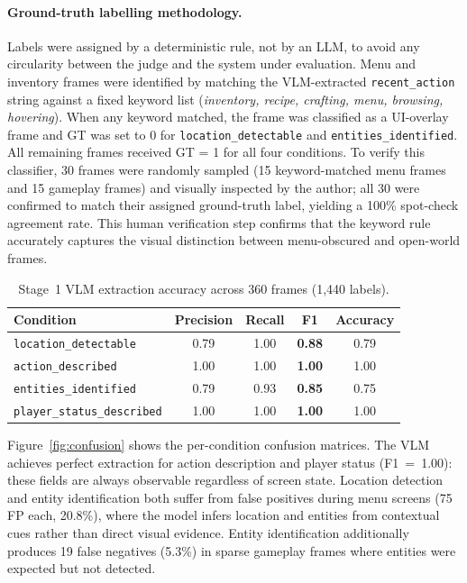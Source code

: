 \documentclass[11pt]{article}
\begin{document}
\paragraph{Ground-truth labelling methodology.}
Labels were assigned by a deterministic rule, not by an LLM, to avoid any circularity between the judge and the system under evaluation. Menu and inventory frames were identified by matching the VLM-extracted \texttt{recent\_action} string against a fixed keyword list (\textit{inventory, recipe, crafting, menu, browsing, hovering}). When any keyword matched, the frame was classified as a UI-overlay frame and GT was set to 0 for \texttt{location\_detectable} and \texttt{entities\_identified}. All remaining frames received GT = 1 for all four conditions. To verify this classifier, 30 frames were randomly sampled (15 keyword-matched menu frames and 15 gameplay frames) and visually inspected by the author; all 30 were confirmed to match their assigned ground-truth label, yielding a 100\% spot-check agreement rate. This human verification step confirms that the keyword rule accurately captures the visual distinction between menu-obscured and open-world frames.

\begin{table}[h]
\centering
\caption{Stage~1 VLM extraction accuracy across 360 frames (1{,}440 labels).}
\label{tab:stage1}
\begin{tabular}{lcccc}
\toprule
Condition & Precision & Recall & F1 & Accuracy \\
\midrule
\texttt{location\_detectable}     & 0.79 & 1.00 & \textbf{0.88} & 0.79 \\
\texttt{action\_described}        & 1.00 & 1.00 & \textbf{1.00} & 1.00 \\
\texttt{entities\_identified}     & 0.79 & 0.93 & \textbf{0.85} & 0.75 \\
\texttt{player\_status\_described}& 1.00 & 1.00 & \textbf{1.00} & 1.00 \\
\bottomrule
\end{tabular}
\end{table}

Figure~\ref{fig:confusion} shows the per-condition confusion matrices. The VLM achieves perfect extraction for action description and player status (F1~=~1.00): these fields are always observable regardless of screen state. Location detection and entity identification both suffer from false positives during menu screens (75 FP each, 20.8\%), where the model infers location and entities from contextual cues rather than direct visual evidence. Entity identification additionally produces 19 false negatives (5.3\%) in sparse gameplay frames where entities were expected but not detected.
\end{document}
